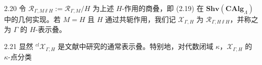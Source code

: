 \begin{defn}{2.20}\label{defn:a2-2-20}
令 $\mathcal R_{\Gamma,M\sslash H}:=\mathcal R_{\Gamma,M}/H$ 为上述 $H$-作用的商叠，即 (2.19) 在 $\mathbf{Shv}(\mathbf{CAlg}_\Lambda)$ 中的几何实现。若 $M=H$ 且 $H$ 通过共轭作用，我们记 $\mathcal X_{\Gamma,H}$ 为 $\mathcal R_{\Gamma,H\sslash H}$，并称之为 $\Gamma$ 的 $H$-表示叠。
\end{defn}

\begin{rem}{2.21}\label{rem:a2-2-21}
显然 ${}^{cl}\mathcal X_{\Gamma,H}$ 是文献中研究的通常表示叠。特别地，对代数闭域 $\kappa$，$\mathcal X_{\Gamma,H}$ 的 $\kappa$-点分类
\end{rem}

